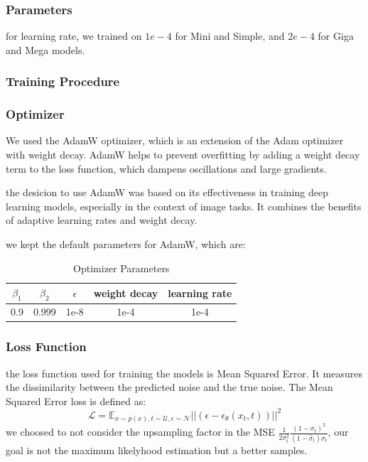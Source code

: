 \documentclass[twocolumn,superscriptaddress,aps]{revtex4-1}
\begin{document}
\subsubsection{Parameters}
for learning rate, we trained on $1e-4$ for Mini and Simple, and $2e-4$ for Giga and Mega models.

\subsubsection{Training Procedure}

\subsubsection{Optimizer}
We used the AdamW optimizer, which is an extension of the Adam optimizer with weight decay. AdamW helps to prevent overfitting by adding a weight decay term to the loss function, which dampens oscillations and large gradients.

the desicion to use AdamW was based on its effectiveness in training deep learning models, especially in the context of image tasks. It combines the benefits of adaptive learning rates and weight decay.

we kept the default parameters for AdamW, which are:
\begin{table}[h]
    \centering
    \begin{tabular}{|c|c|c|c|c|}
        \hline
        $\beta_1$ & $\beta_2$ & $\epsilon$ & weight decay & learning rate \\
        \hline
        0.9 & 0.999 & 1e-8 & 1e-4 & 1e-4 \\
        \hline
    \end{tabular}
    \caption{Optimizer Parameters}
    \label{tab:optimizer_params}
\end{table}

\subsubsection{Loss Function}
the loss function used for training the models is Mean Squared Error. It measures the dissimilarity between the predicted noise and the true noise.
The Mean Squared Error loss is defined as:
\[
\mathcal{L} = \mathbb{E}_{x \sim p(x), t \sim \mathcal{U}, \epsilon \sim \mathcal{N} } ||(\epsilon - \epsilon_\theta (x_t, t))||^2
\]
we choosed to not consider the upsampling factor in the MSE $\frac{1}{2\sigma_t^2} \frac{(1 - \sigma_t)^2}{(1 - \hat \sigma_t) \sigma_t}$, our goal is not the maximum likelyhood estimation but a better samples.
\end{document}
